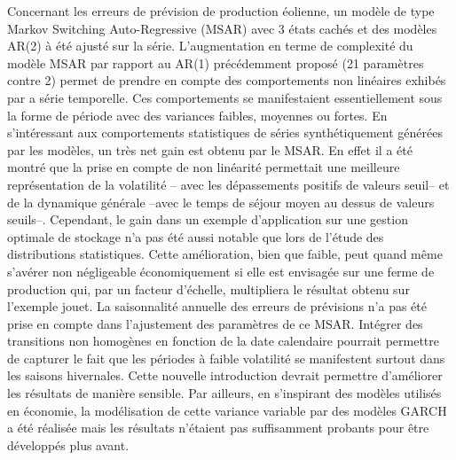 \documentclass[12pt]{report}
\begin{document}
Concernant les erreurs de prévision de production éolienne, un modèle de type Markov Switching Auto-Regressive (MSAR) avec 3 états cachés et des modèles AR(2) à été ajusté sur la série. L'augmentation en terme de complexité du modèle MSAR par rapport au AR(1) précédemment proposé (21 paramètres contre 2) permet de prendre en compte des comportements non linéaires exhibés par a série temporelle. Ces comportements se manifestaient essentiellement sous la forme de période avec des variances faibles, moyennes ou fortes. En s'intéressant aux comportements statistiques de séries synthétiquement générées par les modèles, un très net gain est obtenu par le MSAR. En effet il a été montré que la prise en compte de non linéarité permettait une meilleure représentation de la volatilité -- avec les dépassements positifs de valeurs seuil-- et de la dynamique générale --avec le temps de séjour moyen au dessus de valeurs seuils--. Cependant, le gain dans un exemple d'application sur une gestion optimale de stockage n'a pas été aussi notable que lors de l'étude des distributions statistiques. Cette amélioration, bien que faible, peut quand même s'avérer non négligeable économiquement si elle est envisagée sur une ferme de production qui, par un facteur d'échelle, multipliera le résultat obtenu sur l'exemple jouet. La saisonnalité annuelle des erreurs de prévisions n'a pas été prise en compte dans l'ajustement des paramètres de ce MSAR. Intégrer des transitions non homogènes en fonction de la date calendaire pourrait permettre de capturer le fait que les périodes à faible volatilité se manifestent surtout dans les saisons hivernales. Cette nouvelle introduction devrait permettre d'améliorer les résultats de manière sensible. Par ailleurs, en s'inspirant des modèles utilisés en économie, la modélisation de cette variance variable par des modèles GARCH a été réalisée mais les résultats n'étaient pas suffisamment probants pour être développés plus avant.
\end{document}
